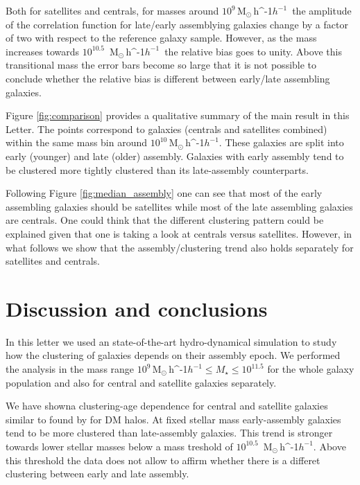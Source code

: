 \documentclass[fleqn,usenatbib]{mnras}
\newcommand{\Msunh}{\,{\rm M}$_{\odot}$\,\ifmmode h^{-1}\else $h^{-1}$\fi}
\begin{document}
Both for satellites and centrals, for masses around
$10^{9}$\Msunh\ the amplitude of the correlation function for
late/early assemblying galaxies change by a factor of two with respect
to the reference galaxy sample. 
However, as the mass increases towards $10^{10.5}$ \Msunh\ the relative
bias goes to unity.  
Above this transitional mass the error bars become so large that 
it is not possible to conclude whether the relative bias is different
between early/late assembling galaxies.  

Figure \ref{fig:comparison} provides a qualitative summary of the main
result in this Letter.
The points correspond to galaxies (centrals and satellites combined) 
within the same mass bin around $10^{10}$\Msunh. 
These galaxies are split into early (younger) and late (older)
assembly. 
Galaxies with early assembly tend to be clustered more tightly
clustered than its late-assembly counterparts.

Following Figure \ref{fig:median_assembly} one can see that most of the early
assembling galaxies should be satellites while most of the late
assembling galaxies are centrals. 
One could think that the different clustering pattern could be
explained given that one is taking a look at centrals versus
satellites. 
However, in what follows we show that the assembly/clustering trend also
holds separately for satellites and centrals.  



\section{Discussion and conclusions}
\label{sec:conclu}

In this letter we used an state-of-the-art hydro-dynamical simulation
to study how the clustering of galaxies depends on their assembly
epoch.
We performed the analysis in the mass range $10^{9}$\Msunh $\leq
M_{\star} \leq 10^{11.5}$ for the whole galaxy population and also for 
central and satellite galaxies separately.

We have showna clustering-age  dependence for central and
satellite galaxies similar to found by \citet{2005MNRAS.363L..66G}
for DM halos. 
At fixed stellar mass early-assembly galaxies tend to be more
clustered than late-assembly galaxies.
This trend is stronger towards lower stellar masses below a mass
treshold of $10^{10.5}$
\Msunh. 
Above this threshold the data does not allow to affirm whether there
is a differet clustering between early and late assembly. 
\end{document}
